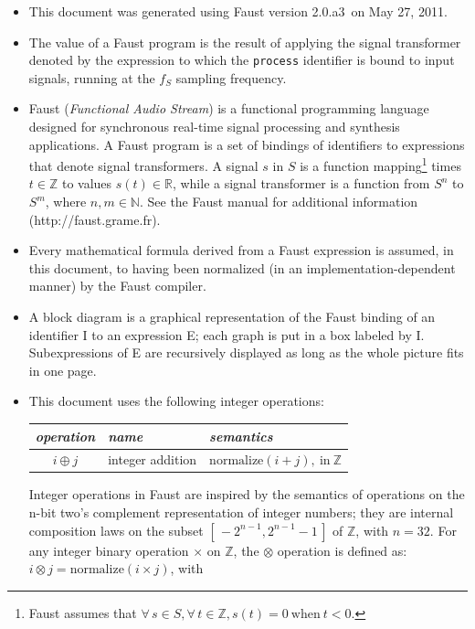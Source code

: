 \documentclass{article}
\newcommand{\faustversion}{2.0.a3}
\newcommand{\faustdocdate}{May 27, 2011}
\begin{document}
\begin{itemize}
	\item This document was generated using Faust version \faustversion\ on \faustdocdate.
	\item The value of a Faust program is the result of applying the signal transformer denoted by the expression to which the \texttt{process} identifier is bound to input signals, running at the $f_S$ sampling frequency.
	\item Faust (\emph{Functional Audio Stream}) is a functional programming language designed for synchronous real-time signal processing and synthesis applications. A Faust program is a set of bindings of identifiers to expressions that denote signal transformers. A signal $s$ in $S$ is a function mapping\footnote{Faust assumes that $\forall \, s \in S, \forall \, t \in \mathbb{Z}, s(t) = 0 \mathrm{\ when\ } t < 0$.} times $t \in \mathbb{Z}$ to values $s(t) \in \mathbb{R}$, while a signal transformer is a function from $S^n$ to $S^m$, where $n,m\in \mathbb{N}$. See the Faust manual for additional information (\textsf{http://faust.grame.fr}).
	\item Every mathematical formula derived from a Faust expression is assumed, in this document, to having been normalized (in an implementation-depen\-dent manner) by the Faust compiler.
	\item A block diagram is a graphical representation of the Faust binding of an identifier I to an expression E; each graph is put in a box labeled by I. Subexpressions of E are recursively displayed as long as the whole picture fits in one page.
	\item 
		This document uses the following integer operations:
	\begin{center}
	\begin{tabular}{|c|l|l|} 
		\hline 
		\emph{operation} & \emph{name} & \emph{semantics} \\
		\hline 
		$i \oplus j$ & integer addition & $\mathrm{normalize}(i+j), \mathrm{~in~} \mathbb{Z}$ \\
		\hline 
	\end{tabular} 
	\end{center}
		Integer operations in Faust are inspired by the semantics of operations on the n-bit two's complement representation of integer numbers; they are internal composition laws on the subset $[\,-2^{n-1}, 2^{n-1}\!-\!1\,]$ of $\mathbb{Z}$, with $n = 32$. For any integer binary operation $\times$ on $\mathbb{Z}$, the $\otimes$ operation is defined as: $i \otimes j = \mathrm{normalize}(i \times j)$, with 

\end{itemize}
\end{document}

